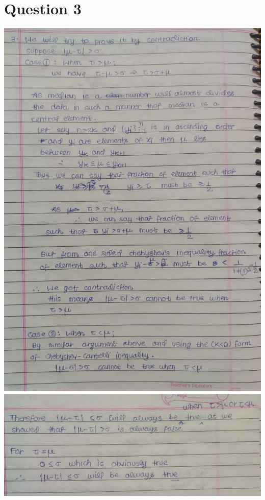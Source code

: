 \documentclass{article}
\theoremstyle{remark}
\begin{document}
\section{Question 3}
\begin{center}
    \includegraphics[width=\textwidth,height=\textheight,keepaspectratio]{q3_1.jpeg}
    \newpage
    \includegraphics[width=\textwidth,height=\textheight,keepaspectratio]{q3_2.jpeg}
\end{center}
\end{document}
